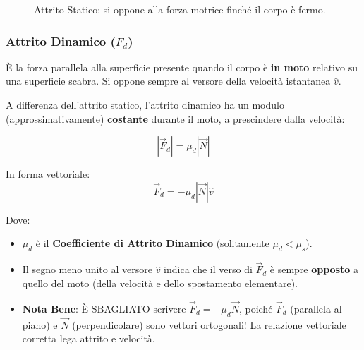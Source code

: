 \begin{figure}[h!]
    \centering
    \caption{Attrito Statico: si oppone alla forza motrice finché il corpo è fermo.}
\end{figure}

\subsubsection{Attrito Dinamico ($F_d$)}
È la forza parallela alla superficie presente quando il corpo è \textbf{in moto} relativo su una superficie scabra.
Si oppone sempre al versore della velocità istantanea $\hat{v}$.

A differenza dell'attrito statico, l'attrito dinamico ha un modulo (approssimativamente) \textbf{costante} durante il moto, a prescindere dalla velocità:

\begin{equation}
    |\vec{F}_d| = \mu_d |\vec{N}|
\end{equation}

In forma vettoriale:
\begin{equation}
    \vec{F}_d = - \mu_d |\vec{N}| \hat{v}
\end{equation}

Dove:
\begin{itemize}
    \item $\mu_d$ è il \textbf{Coefficiente di Attrito Dinamico} (solitamente $\mu_d < \mu_s$).
    \item Il segno meno unito al versore $\hat{v}$ indica che il verso di $\vec{F}_d$ è sempre \textbf{opposto} a quello del moto (della velocità e dello spostamento elementare).
    \item \textbf{Nota Bene}: È SBAGLIATO scrivere $\vec{F}_d = -\mu_d \vec{N}$, poiché $\vec{F}_d$ (parallela al piano) e $\vec{N}$ (perpendicolare) sono vettori ortogonali! La relazione vettoriale corretta lega attrito e velocità.
\end{itemize}

